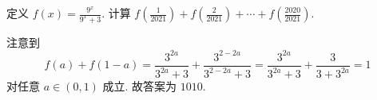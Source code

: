 \begin{prob}
\label{prob:prob-6}
定义 $f(x) = \frac{9^x}{9^x + 3}$.
计算 $f(\frac{1}{2021}) + f(\frac{2}{2021}) + \cdots + f(\frac{2020}{2021})$.
\end{prob}

\begin{soln}
注意到
\begin{equation}
\label{eq8}
f(a) + f(1-a) = \frac{3^{2a}}{3^{2a} + 3} + \frac{3^{2-2a}}{3^{2-2a} + 3}
=\frac{3^{2a}}{3^{2a} + 3} + \frac{3}{3 + 3^{2a}} = 1
\end{equation}
对任意 $a \in (0,1)$ 成立.
故答案为 $\boxed{1010.}$
\end{soln}

